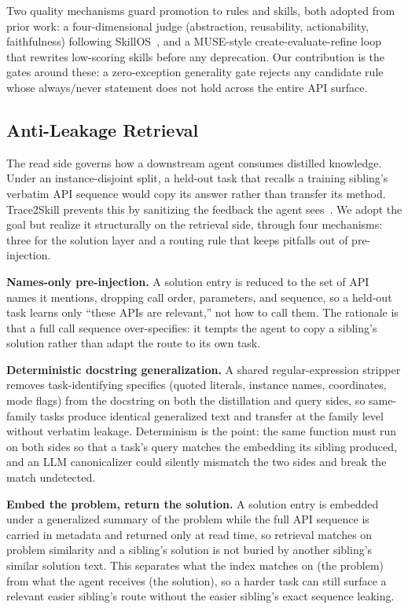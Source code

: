 \documentclass[conference]{IEEEtran}
\begin{document}
Two quality mechanisms guard promotion to rules and skills, both adopted from prior work: a four-dimensional judge (abstraction, reusability, actionability,
faithfulness) following SkillOS~\cite{ouyang2026skillos}, and a MUSE-style create-evaluate-refine loop~\cite{lin2026muse} that rewrites low-scoring skills before any deprecation. Our contribution is the gates around these: a zero-exception generality gate rejects any candidate rule whose always/never statement does not hold across the entire API surface.

\subsection{Anti-Leakage Retrieval}
\label{sec:se_read}

The read side governs how a downstream agent consumes distilled knowledge. Under an instance-disjoint split, a held-out task that recalls a training sibling's verbatim API sequence would copy its answer rather than transfer its method. Trace2Skill prevents this by sanitizing the feedback the agent sees~\cite{du2026trace2skill}. We adopt the goal but realize it structurally on the retrieval side, through four mechanisms: three for the solution layer and a routing rule that keeps pitfalls out of pre-injection.

\textbf{Names-only pre-injection.}
A solution entry is reduced to the set of API names it mentions, dropping call order, parameters, and sequence, so a held-out task learns only ``these APIs are relevant,'' not how to call them. The rationale is that a full call sequence over-specifies: it tempts the agent to copy a sibling's solution rather than adapt the route to its own task.

\textbf{Deterministic docstring generalization.}
A shared regular-expression stripper removes task-identifying specifics (quoted literals, instance names, coordinates, mode flags) from the docstring on both the distillation and query sides, so same-family tasks produce identical generalized text and transfer at the family level without verbatim leakage. Determinism is the point: the same function must run on both sides so
that a task's query matches the embedding its sibling produced, and an LLM canonicalizer could silently mismatch the two sides and break the match undetected.

\textbf{Embed the problem, return the solution.}
A solution entry is embedded under a generalized summary of the problem while the full API sequence is carried in metadata and returned only at read time, so retrieval matches on problem similarity and a sibling's solution is not buried by another sibling's similar solution text. This separates what the index matches on (the problem) from what the agent receives (the solution), so a harder task can still surface a relevant easier sibling's route without the easier sibling's exact sequence leaking.
\end{document}
